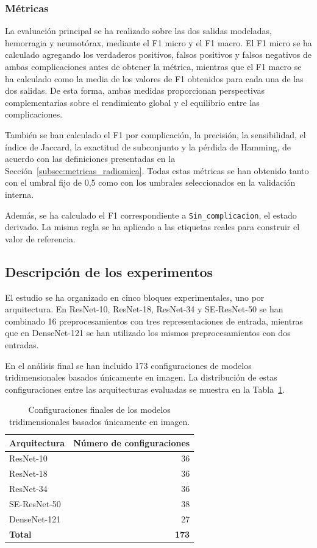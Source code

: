 \subsubsection{Métricas}\label{subsubsec:metricas_dl}
La evaluación principal se ha realizado sobre las dos salidas modeladas, hemorragia y neumotórax, mediante el F1 micro y el F1 macro. El F1 micro se ha calculado agregando los verdaderos positivos, falsos positivos y falsos negativos de ambas complicaciones antes de obtener la métrica, mientras que el F1 macro se ha calculado como la media de los valores de F1 obtenidos para cada una de las dos salidas. De esta forma, ambas medidas proporcionan perspectivas complementarias sobre el rendimiento global y el equilibrio entre las complicaciones.

También se han calculado el F1 por complicación, la precisión, la sensibilidad, el índice de Jaccard, la exactitud de subconjunto y la pérdida de Hamming, de acuerdo con las definiciones presentadas en la Sección~\ref{subsec:metricas_radiomica}. Todas estas métricas se han obtenido tanto con el umbral fijo de 0,5 como con los umbrales seleccionados en la validación interna.

Además, se ha calculado el F1 correspondiente a \texttt{Sin\_complicacion}, el estado derivado. La misma regla se ha aplicado a las etiquetas reales para construir el valor de referencia.



\subsection{Descripción de los experimentos}

El estudio se ha organizado en cinco bloques experimentales, uno por arquitectura. En ResNet-10, ResNet-18, ResNet-34 y SE-ResNet-50 se han combinado 16 preprocesamientos con tres representaciones de entrada, mientras que en DenseNet-121 se han utilizado los mismos preprocesamientos con dos entradas.

En el análisis final se han incluido 173 configuraciones de modelos tridimensionales basados únicamente en imagen. La distribución de estas configuraciones entre las arquitecturas evaluadas se muestra en la Tabla~\ref{tab:dl_experimentos}.

\begin{table}[htbp]
    \centering
    \caption{Configuraciones finales de los modelos tridimensionales basados únicamente en imagen.}
    \label{tab:dl_experimentos}
    \begin{tabular}{lr}
        \toprule
        \textbf{Arquitectura} & \textbf{Número de configuraciones} \\
        \midrule
        ResNet-10     & 36 \\
        ResNet-18     & 36 \\
        ResNet-34     & 36 \\
        SE-ResNet-50  & 38 \\
        DenseNet-121  & 27 \\
        \midrule
        \textbf{Total} & \textbf{173} \\
        \bottomrule
    \end{tabular}
\end{table}


